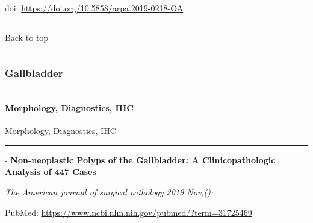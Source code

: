 \documentclass[
]{article}
\renewcommand{\linethickness}{0.05em}
\begin{document}
doi: \url{https://doi.org/10.5858/arpa.2019-0218-OA}

\begin{center}\rule{0.5\linewidth}{\linethickness}\end{center}

Back to top

\begin{center}\rule{0.5\linewidth}{\linethickness}\end{center}

\pagebreak

\hypertarget{gallbladder}{%
\subsubsection{Gallbladder}\label{gallbladder}}

\begin{center}\rule{0.5\linewidth}{\linethickness}\end{center}

\hypertarget{morphology-diagnostics-ihc-1}{%
\paragraph{Morphology, Diagnostics,
IHC}\label{morphology-diagnostics-ihc-1}}

Morphology, Diagnostics, IHC

\begin{center}\rule{0.5\linewidth}{\linethickness}\end{center}

- \textbf{Non-neoplastic Polyps of the Gallbladder: A Clinicopathologic
Analysis of 447 Cases}

\emph{The American journal of surgical pathology 2019 Nov;():}

PubMed: \url{https://www.ncbi.nlm.nih.gov/pubmed/?term=31725469}
\end{document}
